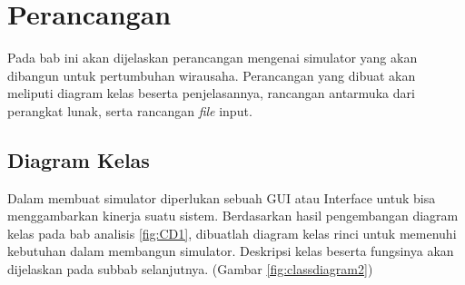 \chapter{Perancangan}
\label{chap:perancangan}

Pada bab ini akan dijelaskan perancangan mengenai simulator yang akan dibangun untuk pertumbuhan wirausaha. Perancangan yang dibuat akan meliputi diagram kelas beserta penjelasannya, rancangan antarmuka dari perangkat lunak, serta rancangan \textit{file} input.


\section{Diagram Kelas}
\label{sec:perancangankelas}

Dalam membuat simulator diperlukan sebuah GUI atau Interface untuk bisa menggambarkan kinerja suatu sistem. Berdasarkan hasil pengembangan diagram kelas pada bab analisis \ref{fig:CD1}, dibuatlah diagram kelas rinci untuk memenuhi kebutuhan dalam membangun simulator. Deskripsi kelas beserta fungsinya akan dijelaskan pada subbab selanjutnya. (Gambar \ref{fig:classdiagram2})

